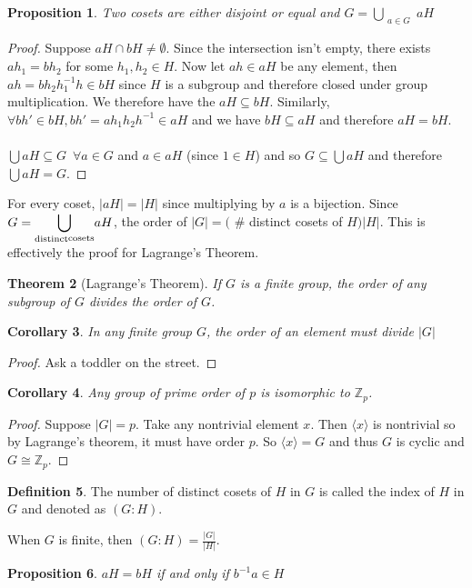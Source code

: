 \documentclass{article}
\newcommand{\Z}{\mathbb{Z}}
\newtheorem{theorem}{Theorem}[section]
\newtheorem{corollary}[theorem]{Corollary}
\newtheorem{proposition}[theorem]{Proposition}
\theoremstyle{definition}
\newtheorem{definition}[theorem]{Definition}
\begin{document}
\begin{proposition}
    Two cosets are either disjoint or equal and $G=\displaystyle{\bigcup_{\substack{a \in G}}} aH$
\end{proposition}
\begin{proof}
    Suppose $aH \cap bH \neq \emptyset$. Since the intersection isn't empty, there exists $ah_1=bh_2$ for some $h_1,h_2 \in H$. Now let $ah \in aH$ be any element, then $ah = bh_2h_1^{-1}h \in  bH$ since $H$ is a subgroup and therefore closed under group multiplication. We therefore have the $aH \subseteq bH$. Similarly, $\forall bh' \in bH, bh'=ah_1h_2h^{-1} \in aH $ and we have $bH \subseteq aH$ and therefore $aH = bH$. \\\\ $\bigcup aH \subseteq G \,\,\, \forall a\in G$ and $a\in aH $ (since $1\in H$) and so $G \subseteq \bigcup aH$ and therefore $\bigcup aH = G$.
\end{proof}
For every coset, $|aH| = |H|$ since multiplying by $a$ is a bijection. Since $G= \displaystyle{\bigcup_{\substack{\text{distinct}}\\\text{cosets}}}aH $, the order of $|G| = ($ \# distinct cosets of $H)|H|$. This is effectively the proof for Lagrange's Theorem.
\begin{theorem}[Lagrange's Theorem]
    If $G$ is a finite group, the order of any subgroup of $G$ divides the order of $G$.
\end{theorem}
\begin{corollary}
    In any finite group $G$, the order of an element must divide $|G|$
\end{corollary}
\begin{proof}
    Ask a toddler on the street.
\end{proof}
\begin{corollary}
    Any group of prime order of $p$ is isomorphic to $\Z_p$.
\end{corollary}
\begin{proof}
    Suppose $|G|=p$. Take any nontrivial element $x$. Then $\langle x \rangle $ is nontrivial so by Lagrange's theorem, it must have order $p$. So $\langle x \rangle = G$ and thus $G$ is cyclic and $G\cong \Z_p$.
\end{proof}
\begin{definition}
    The number of distinct cosets of $H$ in $G$ is called the index of $H$ in $G$ and denoted as $(G:H)$. 
\end{definition}
When $G$ is finite, then $(G:H) = \frac{|G|}{|H|}$.
\begin{proposition}
    $aH = bH$ if and only if $b^{-1}a \in H$
\end{proposition}
\end{document}
